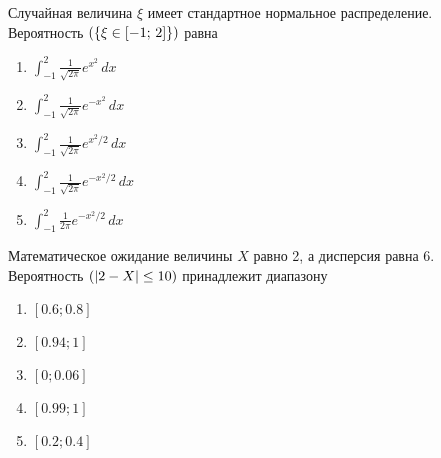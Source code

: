 \documentclass[t]{beamer}
\let\P\relax
\DeclareMathOperator{\P}{\mathbb{P}}
\begin{document}
 \begin{frame} \label{32} 
\begin{block}{32} 

Случайная величина $\xi$ имеет стандартное нормальное распределение. Вероятность $\P(\{\xi \in [-1; \, 2]\})$ равна


 \end{block} 
\begin{enumerate} 
\item[] \hyperlink{32-No}{\beamergotobutton{}  $\int_{-1}^{2}\tfrac{1}{\sqrt{2\pi}}e^{x^2}\,dx$ }
\item[] \hyperlink{32-No}{\beamergotobutton{}  $\int_{-1}^{2}\tfrac{1}{\sqrt{2\pi}}e^{-x^2}\,dx$}
\item[] \hyperlink{32-No}{\beamergotobutton{}  $\int_{-1}^{2}\tfrac{1}{\sqrt{2\pi}}e^{x^2 / 2}\,dx$}
\item[] \hyperlink{32-Yes}{\beamergotobutton{}  $\int_{-1}^{2}\tfrac{1}{\sqrt{2\pi}}e^{-x^2 / 2}\,dx$}
\item[] \hyperlink{32-No}{\beamergotobutton{}  $\int_{-1}^{2}\tfrac{1}{2\pi}e^{-x^2 / 2}\,dx$}
\end{enumerate} 
\end{frame} 


 \begin{frame} \label{33} 
\begin{block}{33} 

Математическое ожидание величины $X$ равно 2, а дисперсия равна 6. Вероятность $\P(|2-X|\leq 10)$ принадлежит диапазону
  


 \end{block} 
\begin{enumerate} 
\item[] \hyperlink{33-No}{\beamergotobutton{} $[0.6; 0.8]$}
\item[] \hyperlink{33-Yes}{\beamergotobutton{} $[0.94; 1]$}
\item[] \hyperlink{33-No}{\beamergotobutton{} $[0; 0.06]$}
\item[] \hyperlink{33-No}{\beamergotobutton{} $[0.99;1]$}
\item[] \hyperlink{33-No}{\beamergotobutton{} $[0.2;0.4]$}
\end{enumerate} 
\end{frame} 
\end{document}
